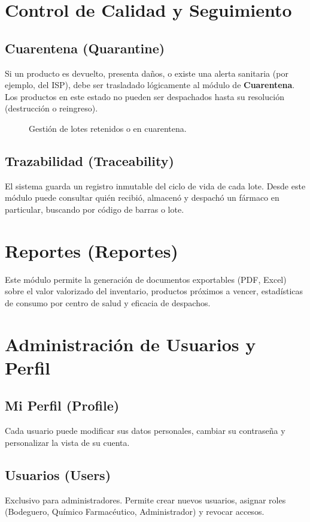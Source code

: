 \documentclass[a4paper, 12pt]{article}
\begin{document}
\section{Control de Calidad y Seguimiento}

\subsection{Cuarentena (Quarantine)}
Si un producto es devuelto, presenta daños, o existe una alerta sanitaria (por ejemplo, del ISP), debe ser trasladado lógicamente al módulo de \textbf{Cuarentena}. Los productos en este estado no pueden ser despachados hasta su resolución (destrucción o reingreso).

\begin{figure}[H]
    \centering
    \caption{Gestión de lotes retenidos o en cuarentena.}
\end{figure}

\subsection{Trazabilidad (Traceability)}
El sistema guarda un registro inmutable del ciclo de vida de cada lote. Desde este módulo puede consultar quién recibió, almacenó y despachó un fármaco en particular, buscando por código de barras o lote.

\section{Reportes (Reportes)}
Este módulo permite la generación de documentos exportables (PDF, Excel) sobre el valor valorizado del inventario, productos próximos a vencer, estadísticas de consumo por centro de salud y eficacia de despachos.

\section{Administración de Usuarios y Perfil}
\subsection{Mi Perfil (Profile)}
Cada usuario puede modificar sus datos personales, cambiar su contraseña y personalizar la vista de su cuenta.
\subsection{Usuarios (Users)}
Exclusivo para administradores. Permite crear nuevos usuarios, asignar roles (Bodeguero, Químico Farmacéutico, Administrador) y revocar accesos.
\end{document}
